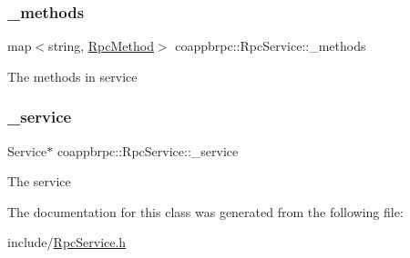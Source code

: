 \subsubsection{\texorpdfstring{\+\_\+methods}{\_methods}}
{\footnotesize\ttfamily map$<$string, \hyperlink{classcoappbrpc_1_1RpcMethod}{Rpc\+Method}$>$ coappbrpc\+::\+Rpc\+Service\+::\+\_\+methods}

The methods in service \mbox{\label{classcoappbrpc_1_1RpcService_ab79621dd2a66b154352101e64f2dfefa}} 
\subsubsection{\texorpdfstring{\+\_\+service}{\_service}}
{\footnotesize\ttfamily Service$\ast$ coappbrpc\+::\+Rpc\+Service\+::\+\_\+service}

The service 

The documentation for this class was generated from the following file\+:\begin{DoxyCompactItemize}
\item 
include/\hyperlink{RpcService_8h}{Rpc\+Service.\+h}\end{DoxyCompactItemize}
